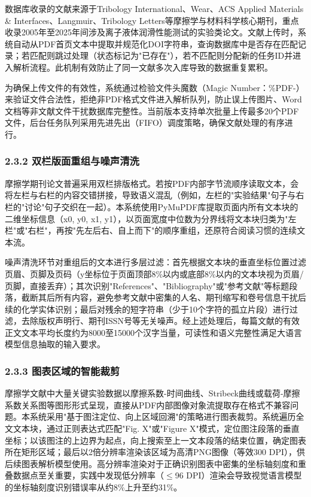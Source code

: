 数据库收录的文献来源于Tribology International、Wear、ACS Applied Materials \& Interfaces、Langmuir、Tribology Letters等摩擦学与材料科学核心期刊，重点收录2005年至2025年间涉及离子液体润滑性能测试的实验类论文。文献上传时，系统自动从PDF首页文本中提取并规范化DOI字符串，查询数据库中是否存在匹配记录；若匹配则跳过处理（状态标记为"已存在"），若不匹配则分配新的任务ID并进入解析流程。此机制有效防止了同一文献多次入库导致的数据重复累积。

为确保上传文件的有效性，系统通过检验文件头魔数（Magic Number：\%PDF-）来验证文件合法性，拒绝非PDF格式文件进入解析队列，防止误上传图片、Word文档等非文献文件干扰数据库完整性。当前版本支持单次批量上传最多20个PDF文件，后台任务队列采用先进先出（FIFO）调度策略，确保文献处理的有序进行。

\hypertarget{ux53ccux680fux7248ux9762ux91cdux7ec4ux4e0eux566aux58f0ux6e05ux6d17}{%
\subsubsection{2.3.2 双栏版面重组与噪声清洗}\label{ux53ccux680fux7248ux9762ux91cdux7ec4ux4e0eux566aux58f0ux6e05ux6d17}}

摩擦学期刊论文普遍采用双栏排版格式。若按PDF内部字节流顺序读取文本，会将左栏与右栏的内容交错拼接，导致语义混乱（例如，左栏的"实验结果"句子与右栏的"讨论"句子交织在一起）。本系统使用PyMuPDF库提取页面内所有文本块的二维坐标信息（x0, y0, x1, y1），以页面宽度中位数为分界线将文本块归类为"左栏"或"右栏"，再按"先左后右、自上而下"的顺序重组，还原符合阅读习惯的连续文本流。

噪声清洗环节对重组后的文本进行多层过滤：首先根据文本块的垂直坐标位置过滤页眉、页脚及页码（y坐标位于页面顶部8\%以内或底部8\%以内的文本块视为页眉/页脚，直接丢弃）；其次识别"References"、"Bibliography"或"参考文献"等标题段落，截断其后所有内容，避免参考文献中密集的人名、期刊缩写和卷号信息干扰后续的化学实体识别；最后对残余的短字符串（少于10个字符的孤立片段）进行过滤，去除版权声明行、期刊ISSN号等无关噪声。经上述处理后，每篇文献的有效正文文本平均长度约为8000至15000个汉字当量，可读性和语义完整性满足大语言模型信息抽取的输入要求。

\hypertarget{ux56feux8868ux533aux57dfux7684ux667aux80fdux88c1ux526a}{%
\subsubsection{2.3.3 图表区域的智能裁剪}\label{ux56feux8868ux533aux57dfux7684ux667aux80fdux88c1ux526a}}

摩擦学文献中大量关键实验数据以摩擦系数-时间曲线、Stribeck曲线或载荷-摩擦系数关系图等图形形式呈现，直接从PDF内部图像对象流提取存在格式不兼容问题。本系统采用"基于图注定位、向上区域回溯"的策略进行图表裁剪。系统遍历全文文本块，通过正则表达式匹配"Fig. X"或"Figure X"模式，定位图注段落的垂直坐标；以该图注的上边界为起点，向上搜索至上一文本段落的结束位置，确定图表所在矩形区域；最后以2倍分辨率渲染该区域为高清PNG图像（等效300 DPI），供后续图表解析模型使用。高分辨率渲染对于正确识别图表中密集的坐标轴刻度和重叠数据点至关重要，实践中发现低分辨率（$\le$96 DPI）渲染会导致视觉语言模型的坐标轴刻度识别错误率从约8\%上升至约31\%。

